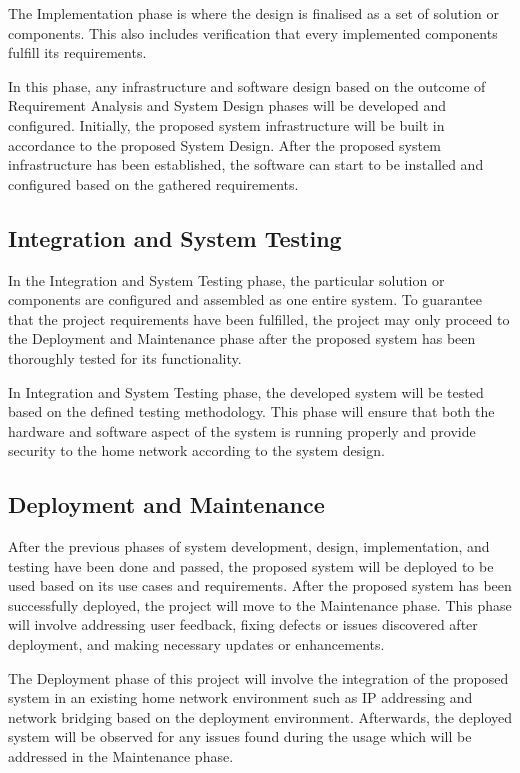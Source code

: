 \documentclass[../index.tex]{subfiles}
\begin{document}
The Implementation phase is where the design is finalised as a set of solution or components. This
also includes verification that every implemented components fulfill its requirements.

In this phase, any infrastructure and software design  based on the outcome of Requirement Analysis
and System Design phases will be developed and configured. Initially, the proposed system
infrastructure will be built in accordance to the proposed System Design. After the proposed system
infrastructure has been established, the software can start to be installed and configured based on
the gathered requirements.

\subsection{Integration and System Testing}

In the Integration and System Testing phase, the particular solution or components are configured
and assembled as one entire system. To guarantee that the project requirements have been fulfilled,
the project may only proceed to the Deployment and Maintenance phase after the proposed system has
been thoroughly tested for its functionality.

In Integration and System Testing phase, the developed system will be tested based on the defined
testing methodology. This phase will ensure that both the hardware and software aspect of the system
is running properly and provide security to the home network according to the system design.

\subsection{Deployment and Maintenance}

After the previous phases of system development, design, implementation, and testing have been done
and passed, the proposed system will be deployed to be used based on its use cases and requirements.
After the proposed system has been successfully deployed, the project will move to the Maintenance
phase. This phase will involve addressing user feedback, fixing defects or issues discovered after
deployment, and making necessary updates or enhancements.

The Deployment phase of this project will involve the integration of the proposed system in an
existing home network environment such as IP addressing and network bridging based on the deployment
environment. Afterwards, the deployed system will be observed for any issues found during the usage
which will be addressed in the Maintenance phase.
\end{document}
